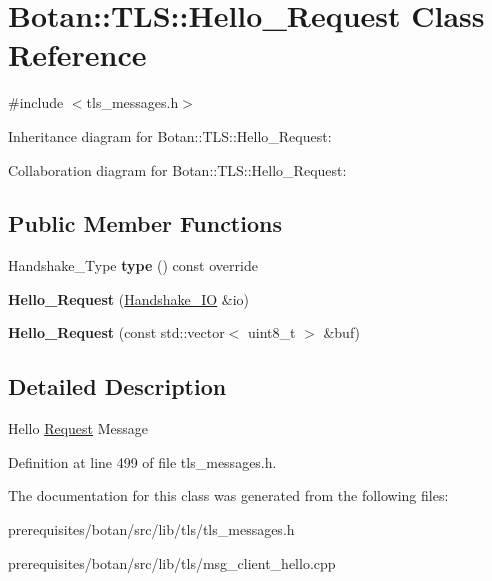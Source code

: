\hypertarget{class_botan_1_1_t_l_s_1_1_hello___request}{}\section{Botan\+:\+:T\+LS\+:\+:Hello\+\_\+\+Request Class Reference}
\label{class_botan_1_1_t_l_s_1_1_hello___request}


{\ttfamily \#include $<$tls\+\_\+messages.\+h$>$}



Inheritance diagram for Botan\+:\+:T\+LS\+:\+:Hello\+\_\+\+Request\+:


Collaboration diagram for Botan\+:\+:T\+LS\+:\+:Hello\+\_\+\+Request\+:
\subsection*{Public Member Functions}
\begin{DoxyCompactItemize}
\item 
\mbox{\label{class_botan_1_1_t_l_s_1_1_hello___request_a9adaf1b83346d623b83e3c21df7f7248}} 
Handshake\+\_\+\+Type {\bfseries type} () const override
\item 
\mbox{\label{class_botan_1_1_t_l_s_1_1_hello___request_a9dc95c12bd9c3268d5b6be0af003efa5}} 
{\bfseries Hello\+\_\+\+Request} (\mbox{\hyperlink{class_botan_1_1_t_l_s_1_1_handshake___i_o}{Handshake\+\_\+\+IO}} \&io)
\item 
\mbox{\label{class_botan_1_1_t_l_s_1_1_hello___request_a05fdf440561c5da3efa6ad487d5b0f4a}} 
{\bfseries Hello\+\_\+\+Request} (const std\+::vector$<$ uint8\+\_\+t $>$ \&buf)
\end{DoxyCompactItemize}


\subsection{Detailed Description}
Hello \mbox{\hyperlink{struct_request}{Request}} Message 

Definition at line 499 of file tls\+\_\+messages.\+h.



The documentation for this class was generated from the following files\+:\begin{DoxyCompactItemize}
\item 
prerequisites/botan/src/lib/tls/tls\+\_\+messages.\+h\item 
prerequisites/botan/src/lib/tls/msg\+\_\+client\+\_\+hello.\+cpp\end{DoxyCompactItemize}
